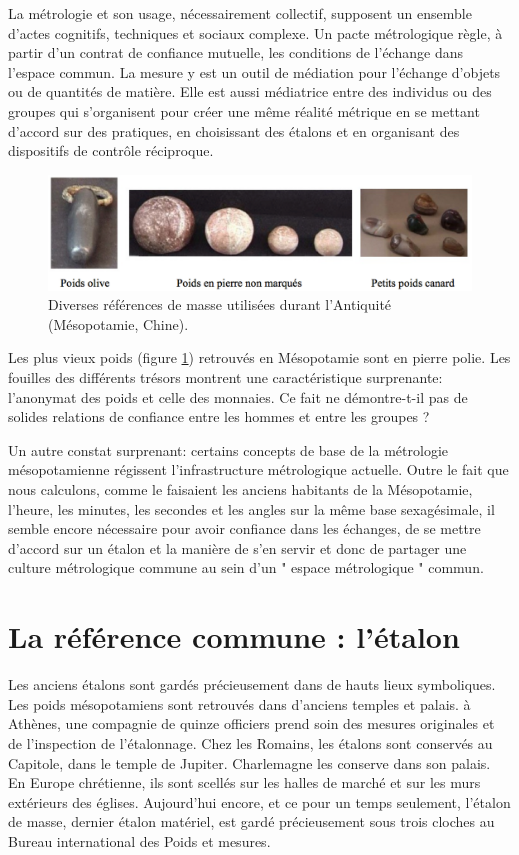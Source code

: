 La métrologie et son usage, nécessairement collectif, supposent un ensemble d'actes cognitifs, techniques et sociaux complexe.  Un pacte métrologique règle, à partir d'un contrat de confiance mutuelle, les conditions de l'échange dans l'espace commun.  La mesure y est un outil de médiation pour l'échange d'objets ou de quantités de matière.  Elle est aussi médiatrice entre des individus ou des groupes qui s'organisent pour créer une même réalité métrique en se mettant d'accord sur des pratiques, en choisissant des étalons et en organisant des dispositifs de contrôle réciproque.

\begin{figure}[h]
   \centering
   \includegraphics[width=15cm]{assets/figures/poids.pdf}
   \caption{Diverses références de masse utilisées durant l'Antiquité (Mésopotamie, Chine).}
   \label{fig:1.1}
\end{figure}
Les plus vieux poids (figure \ref{fig:1.1}) retrouvés en Mésopotamie sont en pierre polie.  Les fouilles des différents trésors montrent une caractéristique surprenante: l'anonymat des poids et celle des monnaies.  Ce fait ne démontre-t-il pas de solides relations de confiance entre les hommes et entre les groupes ?

Un autre constat surprenant: certains concepts de base de la métrologie mésopotamienne régissent l'infrastructure métrologique actuelle. Outre le fait que nous calculons, comme le faisaient les anciens habitants de la Mésopotamie, l'heure, les minutes, les secondes et les angles sur la même base sexagésimale, il semble encore nécessaire pour avoir confiance dans les échanges, de se mettre d'accord sur un étalon et la manière de s'en servir et donc de partager une culture métrologique commune au sein d'un " espace métrologique " commun.

\section{La référence commune : l'étalon}

Les anciens étalons sont gardés précieusement dans de hauts lieux symboliques.  Les poids mésopotamiens sont retrouvés dans d'anciens temples et palais.  à Athènes, une compagnie de quinze officiers prend soin des mesures originales et de l'inspection de l'étalonnage.  Chez les Romains, les étalons sont conservés au Capitole, dans le temple de Jupiter. Charlemagne les conserve dans son palais.  En Europe chrétienne, ils sont scellés sur les halles de marché et sur les murs extérieurs des églises.  Aujourd'hui encore, et ce pour un temps seulement, l'étalon de masse, dernier étalon matériel, est gardé précieusement sous trois cloches au Bureau international des Poids et mesures.

